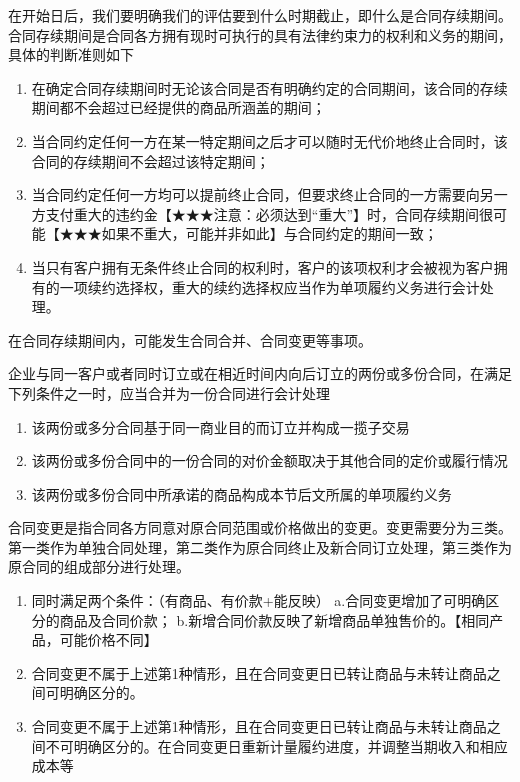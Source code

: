 \documentclass[UTF8,12pt]{ctexart}
\numberwithin{equation}{section} %
\numberwithin{figure}{section}
\numberwithin{table}{section}
\begin{document}
	在开始日后，我们要明确我们的评估要到什么时期截止，即什么是合同存续期间。合同存续期间是合同各方拥有现时可执行的具有法律约束力的权利和义务的期间，具体的判断准则如下
	\begin{enumerate}
		\item 在确定合同存续期间时无论该合同是否有明确约定的合同期间，该合同的存续期间都不会超过已经提供的商品所涵盖的期间；
		
		\item 当合同约定任何一方在某一特定期间之后才可以随时无代价地终止合同时，该合同的存续期间不会超过该特定期间；
		
		\item 当合同约定任何一方均可以提前终止合同，但要求终止合同的一方需要向另一方支付重大的违约金【★★★注意：必须达到“重大”】时，合同存续期间很可能【★★★如果不重大，可能并非如此】与合同约定的期间一致；
		
		\item 当只有客户拥有无条件终止合同的权利时，客户的该项权利才会被视为客户拥有的一项续约选择权，重大的续约选择权应当作为单项履约义务进行会计处理。
	\end{enumerate}
	
	在合同存续期间内，可能发生合同合并、合同变更等事项。
	
	企业与同一客户或者同时订立或在相近时间内向后订立的两份或多份合同，在满足下列条件之一时，应当合并为一份合同进行会计处理
	\begin{enumerate}
		\item 该两份或多分合同基于同一商业目的而订立并构成一揽子交易
		
		\item 该两份或多份合同中的一份合同的对价金额取决于其他合同的定价或履行情况
		
		\item 该两份或多份合同中所承诺的商品构成本节后文所属的单项履约义务
	\end{enumerate}

	合同变更是指合同各方同意对原合同范围或价格做出的变更。变更需要分为三类。第一类作为单独合同处理，第二类作为原合同终止及新合同订立处理，第三类作为原合同的组成部分进行处理。
	\begin{enumerate}
		\item 同时满足两个条件：（有商品、有价款+能反映）
		a.合同变更增加了可明确区分的商品及合同价款；
		b.新增合同价款反映了新增商品单独售价的。【相同产品，可能价格不同】
		
		\item 合同变更不属于上述第1种情形，且在合同变更日已转让商品与未转让商品之间可明确区分的。
		
		\item 合同变更不属于上述第1种情形，且在合同变更日已转让商品与未转让商品之间不可明确区分的。在合同变更日重新计量履约进度，并调整当期收入和相应成本等
	\end{enumerate}
	
\end{document}
